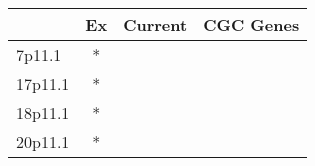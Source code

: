\begin{tabular}{lccr}
\toprule
{} & Ex & Current & CGC Genes \\
\midrule
7p11.1  &  * &         &           \\
17p11.1 &  * &         &           \\
18p11.1 &  * &         &           \\
20p11.1 &  * &         &           \\
\bottomrule
\end{tabular}
